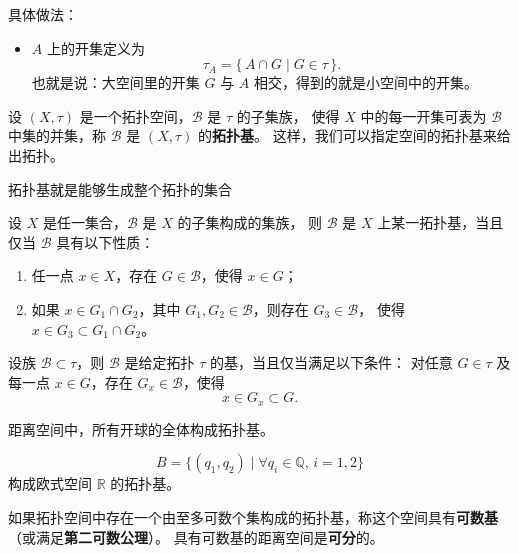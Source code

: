 \medskip
\noindent
具体做法：
\begin{itemize}
  \item $A$ 上的开集定义为
  \[
  \tau_A=\{\,A\cap G \mid G\in\tau\,\}.
  \]
  也就是说：大空间里的开集 $G$ 与 $A$ 相交，得到的就是小空间中的开集。
\end{itemize}
\begin{definition}[拓扑基]
设 $(X,\tau)$ 是一个拓扑空间，$\mathcal{B}$ 是 $\tau$ 的子集族，
使得 $X$ 中的每一开集可表为 $\mathcal{B}$ 中集的并集，称 $\mathcal{B}$ 是 $(X,\tau)$ 的\textbf{拓扑基}。
这样，我们可以指定空间的拓扑基来给出拓扑。
\end{definition}
拓扑基就是能够生成整个拓扑的集合
\begin{theorem}[拓扑基的性质]
设 $X$ 是任一集合，$\mathcal{B}$ 是 $X$ 的子集构成的集族，
则 $\mathcal{B}$ 是 $X$ 上某一拓扑基，当且仅当 $\mathcal{B}$ 具有以下性质：
\begin{enumerate}
  \item 任一点 $x\in X$，存在 $G\in\mathcal{B}$，使得 $x\in G$；
  \item 如果 $x\in G_{1}\cap G_{2}$，其中 $G_{1},G_{2}\in\mathcal{B}$，则存在 $G_{3}\in\mathcal{B}$，
  使得 $x\in G_{3}\subset G_{1}\cap G_{2}$。
\end{enumerate}
\end{theorem}
\begin{theorem}[拓扑基的判定]
设族 $\mathcal{B} \subset \tau$，则 $\mathcal{B}$ 是给定拓扑 $\tau$ 的基，当且仅当满足以下条件：  
对任意 $G \in \tau$ 及每一点 $x \in G$，存在 $G_x \in \mathcal{B}$，使得
\[
x \in G_x \subset G.
\]
\end{theorem}
\begin{example}
 距离空间中，所有开球的全体构成拓扑基。
\end{example}
\begin{example}
\[
B=\{(q_1,q_2)\mid \forall q_i\in \mathbb{Q},\, i=1,2\}
\]
构成欧式空间 $\mathbb{R}$ 的拓扑基。
\end{example}
\noindent\textcolor{red}{\large\textbullet}\quad 
如果拓扑空间中存在一个由至多可数个集构成的拓扑基，称这个空间具有\textbf{可数基}（或满足\textbf{第二可数公理}）。
\noindent\textcolor{red}{\large\textbullet}\quad 
具有可数基的距离空间是\textbf{可分}的。

